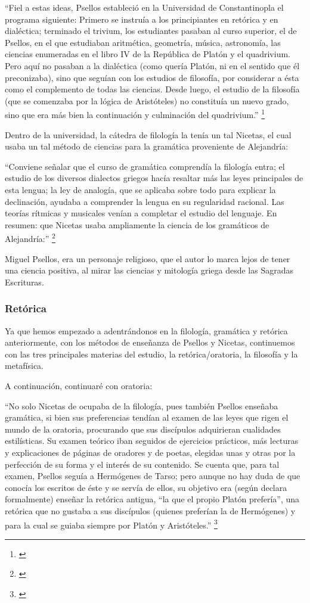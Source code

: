 “Fiel a estas ideas, Psellos estableció en la Universidad de 
Constantinopla el programa siguiente: Primero se instruía a los 
principiantes en retórica y en dialéctica; terminado el trivium, 
los estudiantes pasaban al curso superior, el de Psellos, en el que 
estudiaban aritmética, geometría, música, astronomía, las ciencias 
enumeradas en el libro IV de la República de Platón y el quadrivium. 
Pero aquí no pasaban a la dialéctica (como quería Platón, ni en el 
sentido que él preconizaba), sino que seguían con los estudios de 
filosofía, por considerar a ésta como el complemento de todas las 
ciencias. Desde luego, el estudio de la filosofía 
(que se comenzaba por la lógica de Aristóteles) no constituía un 
nuevo grado, sino que era más bien la continuación y culminación 
del quadrivium.”
\footnote{\cite[pp.~161--162]{filosofia}}

Dentro de la universidad, la cátedra de filología la tenía un tal 
Nicetas, el cual usaba un tal método de ciencias para la 
gramática proveniente de Alejandría:

“Conviene señalar que el curso de gramática comprendía la 
filología entra; el estudio de los diversos dialectos griegos 
hacía resaltar más las leyes principales de esta lengua; la 
ley de analogía, que se aplicaba sobre todo para explicar la 
declinación, ayudaba a comprender la lengua en su regularidad 
racional. Las teorías rítmicas y musicales venían a completar el 
estudio del lenguaje. En resumen: que Nicetas usaba ampliamente la 
ciencia de los gramáticos de Alejandría:”
\footnote{\cite[p.~162]{filosofia}}

Miguel Psellos, era un personaje religioso, que el autor lo marca 
lejos de tener una ciencia positiva, al mirar las ciencias y 
mitología griega desde las Sagradas Escrituras.


\subsubsection{Retórica}
Ya que hemos empezado a adentrándonos en la filología, gramática y 
retórica anteriormente, con los métodos de enseñanza de Psellos y 
Nicetas, continuemos con las tres principales materias del estudio, 
la retórica/oratoria, la filosofía y la metafísica.

A continuación, continuaré con oratoria:

“No solo Nicetas de ocupaba de la filología, pues también Psellos 
enseñaba gramática, si bien sus preferencias tendían al examen de 
las leyes que rigen el mundo de la oratoria, procurando que sus discípulos 
adquirieran cualidades estilísticas. Su examen teórico iban seguidos 
de ejercicios prácticos, más lecturas y explicaciones de páginas 
de oradores y de poetas, elegidas unas y otras por la perfección de 
su forma y el interés de su contenido. Se cuenta que, para tal examen, 
Psellos seguía a Hermógenes de Tarso; pero aunque no hay duda de 
que conocía los escritos de éste y se servía de ellos, su objetivo era 
(según declara formalmente) enseñar la retórica antigua, 
“la que el propio Platón prefería”, una retórica que no gustaba a 
sus discípulos (quienes preferían la de Hermógenes) y para la cual 
se guiaba siempre por Platón y Aristóteles.”
\footnote{\cite[p.~163]{filosofia}}

